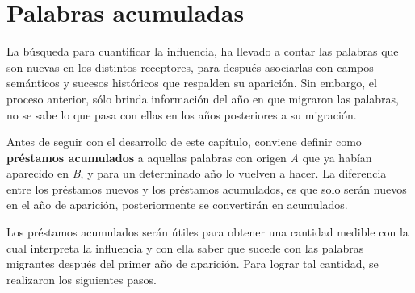 \chapter{Palabras acumuladas}

La búsqueda para cuantificar la influencia, ha llevado a contar las
palabras que son nuevas en los distintos receptores, para después asociarlas con  campos semánticos y sucesos históricos que respalden su aparición. Sin embargo, el proceso anterior, sólo brinda información del año en que migraron las palabras, no se sabe lo que pasa con ellas en los años posteriores a su migración. 

Antes de seguir con el desarrollo de este capítulo, conviene definir como \textbf{préstamos acumulados} a aquellas palabras con origen \textit{A} que ya habían aparecido en \textit{B}, y para un determinado año lo vuelven a hacer.  La diferencia entre los préstamos nuevos y los préstamos acumulados, es que solo serán nuevos en el año de aparición, posteriormente se convertirán en acumulados.

Los préstamos acumulados serán útiles para obtener una cantidad medible con la cual interpreta la influencia y con ella saber que sucede con las palabras migrantes después del primer año de aparición.  Para lograr tal cantidad, se realizaron los siguientes pasos.



